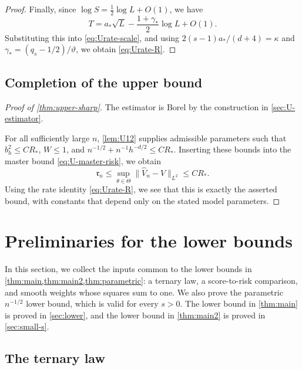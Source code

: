 \begin{proof}
Finally, since $\log S=\tfrac12\log L+O(1)$, we have
\[
 T=a_*\sqrt L-\frac{1+\gamma_*}{2}\log L+O(1).
\]
Substituting this into \eqref{eq:Urate-scale}, and using
$2(s-1)a_* /(d+4)=\kappa$ and
$\gamma_*=(q_s-1/2)/\vartheta$, we obtain \eqref{eq:Urate-R}.
\end{proof}
\section{Completion of the upper bound}\label{sec:U-final}

\begin{proof}[Proof of \cref{thm:upper-sharp}]
The estimator is Borel by the construction in \cref{sec:U-estimator}.

For all sufficiently large $n$, \cref{lem:U12} supplies admissible
parameters such that $b_h^2\le CR_*$, $W\le1$, and
$n^{-1/2}+n^{-1}h^{-d/2}\le CR_*$.
Inserting these bounds into the master bound \eqref{eq:U-master-risk},
we obtain
\[
 \mathfrak r_n\le\sup_{\theta\in\Theta}
 \|\widehat V_n-V\|_{L^2}\le CR_*.
\]
Using the rate identity \eqref{eq:Urate-R}, we see that this is
exactly the asserted bound, with constants that depend only on the stated model parameters.
\end{proof}
\chapter{Preliminaries for the lower bounds}\label{sec:lower-prelim}

In this section, we collect the inputs common to the lower bounds in
\cref{thm:main,thm:main2,thm:parametric}: a ternary law,
a score-to-risk comparison, and smooth weights whose squares
sum to one. We also prove the parametric $n^{-1/2}$ lower bound, which
is valid for every $s>0$. The lower bound in
\cref{thm:main} is proved in \cref{sec:lower}, and the lower
bound in \cref{thm:main2} is proved in \cref{sec:small-s}.

\section{The ternary law}\label{sec:prelim-ternary}

